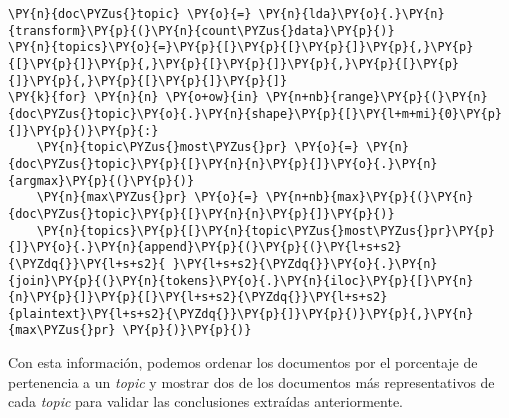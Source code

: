 \vspace{0.5cm}
    \begin{tcolorbox}[breakable, size=fbox, boxrule=1pt, pad at break*=1mm,colback=cellbackground, colframe=cellborder]
\begin{Verbatim}[commandchars=\\\{\}]
\PY{n}{doc\PYZus{}topic} \PY{o}{=} \PY{n}{lda}\PY{o}{.}\PY{n}{transform}\PY{p}{(}\PY{n}{count\PYZus{}data}\PY{p}{)}
\PY{n}{topics}\PY{o}{=}\PY{p}{[}\PY{p}{[}\PY{p}{]}\PY{p}{,}\PY{p}{[}\PY{p}{]}\PY{p}{,}\PY{p}{[}\PY{p}{]}\PY{p}{,}\PY{p}{[}\PY{p}{]}\PY{p}{,}\PY{p}{[}\PY{p}{]}\PY{p}{]}
\PY{k}{for} \PY{n}{n} \PY{o+ow}{in} \PY{n+nb}{range}\PY{p}{(}\PY{n}{doc\PYZus{}topic}\PY{o}{.}\PY{n}{shape}\PY{p}{[}\PY{l+m+mi}{0}\PY{p}{]}\PY{p}{)}\PY{p}{:}
    \PY{n}{topic\PYZus{}most\PYZus{}pr} \PY{o}{=} \PY{n}{doc\PYZus{}topic}\PY{p}{[}\PY{n}{n}\PY{p}{]}\PY{o}{.}\PY{n}{argmax}\PY{p}{(}\PY{p}{)}
    \PY{n}{max\PYZus{}pr} \PY{o}{=} \PY{n+nb}{max}\PY{p}{(}\PY{n}{doc\PYZus{}topic}\PY{p}{[}\PY{n}{n}\PY{p}{]}\PY{p}{)}
    \PY{n}{topics}\PY{p}{[}\PY{n}{topic\PYZus{}most\PYZus{}pr}\PY{p}{]}\PY{o}{.}\PY{n}{append}\PY{p}{(}\PY{p}{(}\PY{l+s+s2}{\PYZdq{}}\PY{l+s+s2}{ }\PY{l+s+s2}{\PYZdq{}}\PY{o}{.}\PY{n}{join}\PY{p}{(}\PY{n}{tokens}\PY{o}{.}\PY{n}{iloc}\PY{p}{[}\PY{n}{n}\PY{p}{]}\PY{p}{[}\PY{l+s+s2}{\PYZdq{}}\PY{l+s+s2}{plaintext}\PY{l+s+s2}{\PYZdq{}}\PY{p}{]}\PY{p}{)}\PY{p}{,}\PY{n}{max\PYZus{}pr} \PY{p}{)}\PY{p}{)}
\end{Verbatim}
\end{tcolorbox}


Con esta información, podemos ordenar los documentos por el porcentaje de pertenencia a un \textit{topic} y mostrar dos de los documentos más representativos de cada \textit{topic} para validar las conclusiones extraídas anteriormente. 
\vspace{0.5cm}

